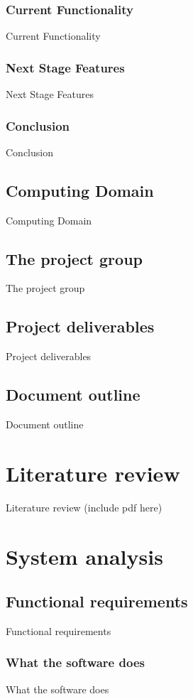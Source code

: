 \documentclass[12pt]{report}
\begin{document}
\section{Current Functionality}
Current Functionality

\section{Next Stage Features}
Next Stage Features

\section{Conclusion}
Conclusion

\chapter{Computing Domain}
Computing Domain

\chapter{The project group}
The project group

\chapter{Project deliverables}
Project deliverables

\chapter{Document outline}
Document outline

\part{Literature review}
Literature review
(include pdf here)

\part{System analysis}

\chapter{Functional requirements}
Functional requirements

\section{What the software does}
What the software does
\end{document}
